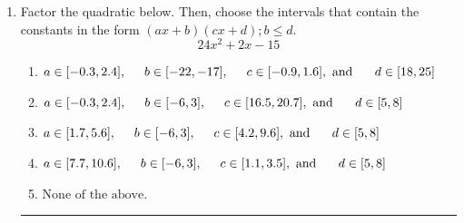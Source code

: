 \documentclass[14pt]{extbook}
\newcommand{\litem}[1]{\item#1\hspace*{-1cm}\rule{\textwidth}{0.4pt}}
\begin{document}
\begin{enumerate}
{\begin{enumerate}[label=\Alph*.]
\end{enumerate} }
\litem{
Factor the quadratic below. Then, choose the intervals that contain the constants in the form $(ax+b)(cx+d); b \leq d.$\[ 24x^{2} +2 x -15 \]\begin{enumerate}[label=\Alph*.]
\item \( a \in [-0.3, 2.4], \hspace*{5mm} b \in [-22, -17], \hspace*{5mm} c \in [-0.9, 1.6], \text{ and } \hspace*{5mm} d \in [18, 25] \)
\item \( a \in [-0.3, 2.4], \hspace*{5mm} b \in [-6, 3], \hspace*{5mm} c \in [16.5, 20.7], \text{ and } \hspace*{5mm} d \in [5, 8] \)
\item \( a \in [1.7, 5.6], \hspace*{5mm} b \in [-6, 3], \hspace*{5mm} c \in [4.2, 9.6], \text{ and } \hspace*{5mm} d \in [5, 8] \)
\item \( a \in [7.7, 10.6], \hspace*{5mm} b \in [-6, 3], \hspace*{5mm} c \in [1.1, 3.5], \text{ and } \hspace*{5mm} d \in [5, 8] \)
\item \( \text{None of the above.} \)


\end{enumerate}}
\end{enumerate}
\end{document}
